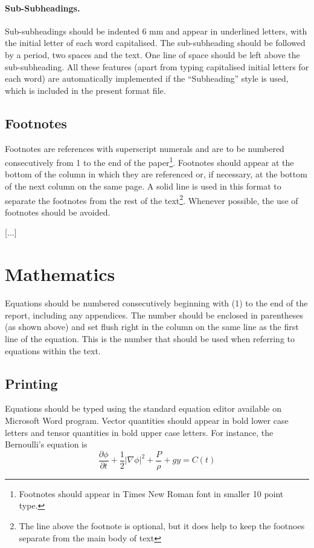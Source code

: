 \documentclass{stabs2021}
\begin{document}
\paragraph{Sub-Subheadings.}

Sub-subheadings should be indented 6 mm and appear in underlined
letters, with the initial letter of each word capitalised. The
sub-subheading should be followed by a period, two spaces and the
text. One line of space should be left above the sub-subheading. All
these features (apart from typing capitalised initial letters for
each word) are automatically implemented if the ``Subheading'' style
is used, which is included in the present format file.

\subsection{Footnotes}

Footnotes are references with superscript numerals and are to be
numbered consecutively from 1 to the end of the
paper\footnote{Footnotes should appear in Times New Roman font in
  smaller 10 point type.}. Footnotes should appear at the bottom of
the column in which they are referenced or, if necessary, at the
bottom of the next column on the same page. A solid line is used in
this format to separate the footnotes from the rest of the
text\footnote{The line above the footnote is optional, but it does
  help to keep the footnoes separate from the main body of
  text}. Whenever possible, the use of footnotes should be avoided.

[...]

\section{Mathematics}

Equations should be numbered consecutively beginning with (1) to the
end of the report, including any appendices. The number should be
enclosed in parentheses (as shown above) and set flush right in the
column on the same line as the first line of the equation. This is the
number that should be used when referring to equations within the
text.

\subsection{Printing}

Equations should be typed using the standard equation editor
available on Microsoft Word program. Vector quantities should appear
in bold lower case letters and tensor quantities in bold upper case
letters. For instance, the Bernoulli’s equation is
\begin{equation}
  \frac{\partial\phi}{\partial t} + \frac12 |\nabla \phi|^2 + \frac P\rho + gy = C(t)
\end{equation}
\end{document}
